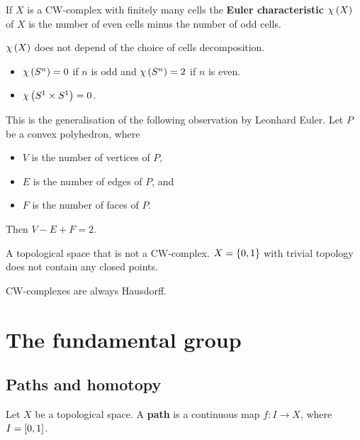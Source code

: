 \begin{definition*}
If $ X $ is a CW-complex with finitely many cells the \textbf{Euler characteristic} $ \chi\rb{X} $ of $ X $ is the number of even cells minus the number of odd cells.
\end{definition*}

\begin{fact*}
$ \chi\rb{X} $ does not depend of the choice of cells decomposition.
\end{fact*}

\begin{example*}
\hfill
\begin{itemize}
\item $ \chi\rb{S^n} = 0 $ if $ n $ is odd and $ \chi\rb{S^n} = 2 $ if $ n $ is even.
\item $ \chi\rb{S^1 \times S^1} = 0 $.
\end{itemize}
\end{example*}

This is the generalisation of the following observation by Leonhard Euler. Let $ P $ be a convex polyhedron, where
\begin{itemize}
\item $ V $ is the number of vertices of $ P $,
\item $ E $ is the number of edges of $ P $, and
\item $ F $ is the number of faces of $ P $.
\end{itemize}
Then $ V - E + F = 2 $.

\begin{example*}
A topological space that is not a CW-complex. $ X = \cb{0, 1} $ with trivial topology does not contain any closed points.
\end{example*}

\begin{fact*}
CW-complexes are always Hausdorff.
\end{fact*}

\pagebreak

\section{The fundamental group}

\subsection{Paths and homotopy}

Let $ X $ be a topological space. A \textbf{path} is a continuous map $ f : I \to X $, where $ I = \sb{0, 1} $.

